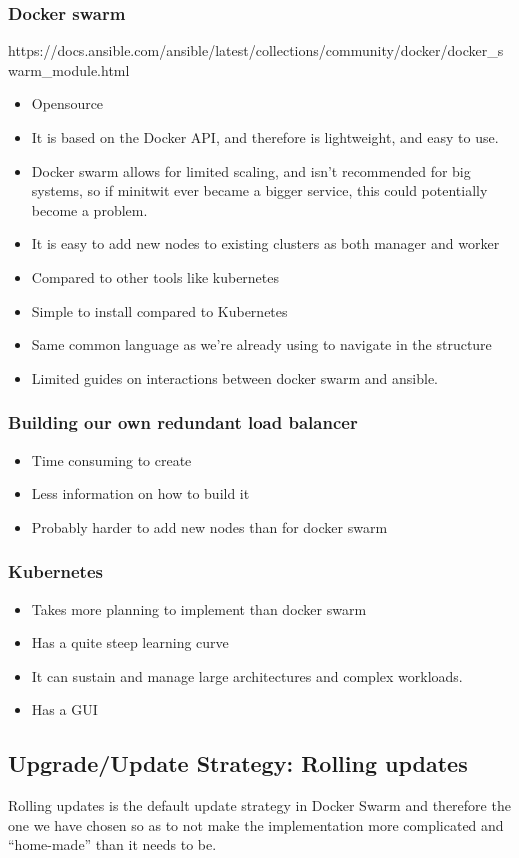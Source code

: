 \subsubsection{Docker swarm}

https://docs.ansible.com/ansible/latest/collections/community/docker/docker_swarm_module.html

\begin{itemize}
    \item Opensource
    \item It is based on the Docker API, and therefore is lightweight, and easy to use.
    \item Docker swarm allows for limited scaling, and isn’t recommended for big systems, so if minitwit ever became a bigger service, this could potentially become a problem.
    \item It is easy to add new nodes to existing clusters as both manager and worker
    \item Compared to other tools like kubernetes
    \item Simple to install compared to Kubernetes
    \item Same common language as we’re already using to navigate in the structure
    \item Limited guides on interactions between docker swarm and ansible.
\end{itemize}

\subsubsection{Building our own redundant load balancer}
\begin{itemize}
    \item Time consuming to create
    \item Less information on how to build it
    \item Probably harder to add new nodes than for docker swarm
\end{itemize}

\subsubsection{Kubernetes}
\begin{itemize}
    \item Takes more planning to implement than docker swarm
    \item Has a quite steep learning curve
    \item It can sustain and manage large architectures and complex workloads.
    \item Has a GUI
\end{itemize}

\subsection{Upgrade/Update Strategy: Rolling updates}
Rolling updates is the default update strategy in Docker Swarm and therefore the one we have chosen so as to not make the implementation more complicated and “home-made” than it needs to be.